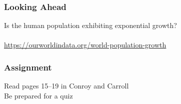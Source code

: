 \documentclass[color=usenames,dvipsnames]{beamer}\usepackage[]{graphicx}\usepackage[]{color}
\begin{document}
\begin{frame}
  \frametitle{Looking Ahead}
  \centering
  Is the human population exhibiting exponential growth? \\
  \vfill
   \\
  \vfill
  \small
  \url{
    https://ourworldindata.org/world-population-growth
  } \\
\end{frame}


%  




\begin{frame}
  \frametitle{Assignment}
  \Large
  Read pages 15--19 in Conroy and Carroll \\
  \vspace{1cm}
  Be prepared for a quiz \\
\end{frame}
\end{document}
